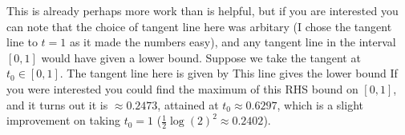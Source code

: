 \documentclass{article}
\begin{document}
This is already perhaps more work than is helpful, but if you are interested you can note that the choice of tangent line here was arbitary (I chose the tangent line to $t=1$ as it made the numbers easy), and any tangent line in the interval $[0,1]$ would have given a lower bound. Suppose we take the tangent at $t_0 \in [0,1]$. The tangent line here is given by 
This line gives the lower bound 
If you were interested you could find the maximum of this RHS bound on $[0,1]$, and it turns out it is $\approx 0.2473$, attained at $t_0 \approx 0.6297$, which is a slight improvement on taking $t_0=1$ ($\frac{1}{2}\log(2)^2 \approx 0.2402$).
\end{document}
